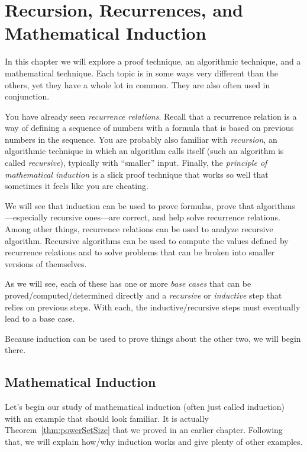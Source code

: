 
\chapter{Recursion, Recurrences, and\\ 
Mathematical Induction}\label{ch:recurrences}
In this chapter we will explore 
a proof technique, an algorithmic technique, and a mathematical technique.  
Each topic is in some ways very different than the others, 
yet they have a whole lot in common.  They are also often used in conjunction.

You have already seen {\em recurrence relations}.  Recall that a recurrence relation is a way of
defining a sequence of numbers with a formula that is based on previous numbers in the sequence.
You are probably also familiar with {\em recursion},
an algorithmic technique in which
an algorithm calls itself (such an algorithm is called {\em recursive}), typically with ``smaller'' input.  
Finally, the {\em principle of mathematical induction} is a slick 
proof technique that works so well that sometimes it feels like 
you are cheating.

We will see that induction can be used to prove formulas, 
prove that algorithms---especially recursive ones---are correct, and help solve recurrence
relations.  Among other things, recurrence relations can be used to analyze recursive algorithm.  
Recursive algorithms can be used to compute the values defined by recurrence
relations and to solve problems that can be broken into smaller versions of themselves.

As we will see, each of these has one or more {\em base cases} that can be proved/computed/determined
directly and a {\em recursive} or {\em inductive} step that relies on previous steps.
With each, the inductive/recursive steps must eventually lead to a base case.

Because induction can be used to prove things about the other two, we will begin there.

\section{Mathematical Induction}\label{sec:induction}
Let's begin our study of mathematical induction (often just called induction) with an example that should look familiar.  
It is actually Theorem~\ref{thm:powerSetSize} that we proved 
in an earlier chapter.
Following that, we will explain how/why induction works and give
plenty of other examples.


